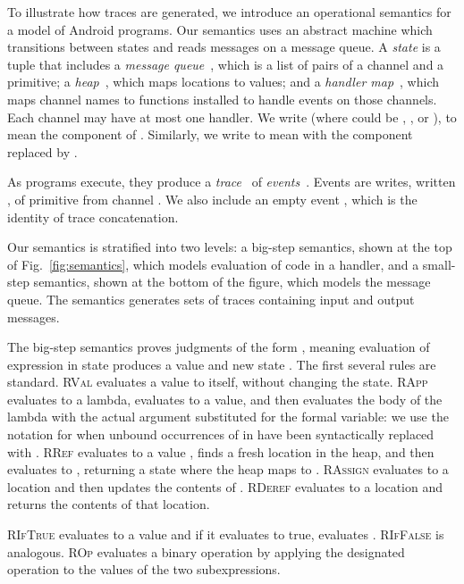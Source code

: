 \documentclass{llncs}
\newcommand{\code}[1]{\textsf{#1}} \newcommand{\bcode}[1]{\texttt{#1}}
\begin{document}
To illustrate how traces are generated, we introduce an operational
semantics for a model of Android programs.  Our semantics uses an
abstract machine which transitions between states and reads messages
on a message queue.  A \emph{state} is a tuple  that
includes a \emph{message queue}~, which is a list of pairs of a channel and a primitive; a
\emph{heap}~, which maps locations to values; and a \emph{handler
  map}~, which maps channel names to functions installed to
handle events on those channels. Each channel may have at most one handler.
We write  (where  could be ,
, or ), to mean the  component of
. Similarly, we write  to mean 
with the  component replaced by .

As programs execute, they produce a \emph{trace}~ of 
\emph{events}~. Events are writes,
written , of primitive  from channel . We also include an empty event
, which is the identity of trace concatenation.

\begin{figure*}[!t]
  \small
  
  \caption{Semantics for our Android subset.}
  \label{fig:semantics}
\end{figure*}

Our semantics is stratified into two levels: a big-step semantics,
shown at the top of Fig.~\ref{fig:semantics}, which models evaluation of code in a
handler, and a small-step semantics, shown at the bottom of the
figure, which models the message queue.  The semantics generates sets
of traces containing input and output messages.



The big-step semantics proves judgments of the form
, meaning
evaluation of expression  in state  produces a value  and
new state . 
The first several rules are standard.
\textsc{RVal} evaluates a value to itself, without changing the
state. \textsc{RApp} evaluates  to a lambda, evaluates  to
a value, and then evaluates the body of the lambda with the actual
argument substituted for the formal variable: we use the notation
 for  when unbound occurrences of  in 
have been syntactically replaced with . 
\textsc{RRef} evaluates  to a value , finds a fresh location
 in the heap, and then evaluates to , returning a state
where the heap maps  to . \textsc{RAssign} evaluates 
to a location  and then updates the contents of
. \textsc{RDeref} evaluates  to a location and returns the
contents of that location.

\textsc{RIfTrue} evaluates  to a value and if it evaluates to
\code{true}, evaluates . \textsc{RIfFalse} is
analogous.
\textsc{ROp} evaluates a binary operation by applying the designated
operation to the values of the two subexpressions.
\end{document}
